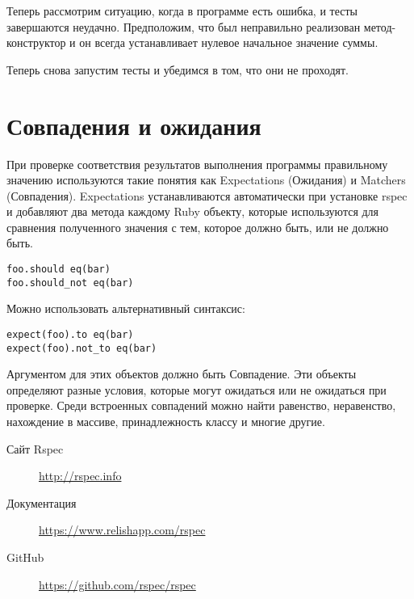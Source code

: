 

Теперь рассмотрим ситуацию, когда в программе есть ошибка, и тесты завершаются неудачно. Предположим, что был неправильно реализован метод-конструктор и он всегда устанавливает нулевое начальное значение суммы.



Теперь снова запустим тесты и убедимся в том, что они не проходят.




\section{Совпадения и ожидания}

При проверке соответствия результатов выполнения программы правильному значению используются такие понятия как Expectations (Ожидания) и Matchers (Совпадения). Expectations устанавливаются автоматически при установке rspec и добавляют два метода каждому Ruby объекту, которые используются для сравнения полученного значения с тем, которое должно быть, или не должно быть.

\begin{verbatim}
foo.should eq(bar)
foo.should_not eq(bar)
\end{verbatim}

Можно использовать альтернативный синтаксис:

\begin{verbatim}
expect(foo).to eq(bar)
expect(foo).not_to eq(bar) 
\end{verbatim}

Аргументом для этих объектов должно быть Совпадение. Эти объекты определяют разные условия, которые могут ожидаться или не ожидаться при проверке. Среди встроенных совпадений можно найти равенство, неравенство, нахождение в массиве, принадлежность классу и многие другие.

\begin{description}
\item[Сайт Rspec] \url{http://rspec.info}
\item[Документация] \url{https://www.relishapp.com/rspec}
\item[GitHub] \url{https://github.com/rspec/rspec}
\end{description}
